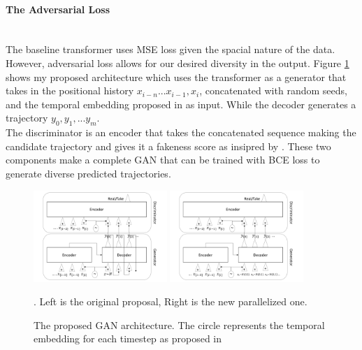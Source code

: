 \documentclass{article}
\begin{document}
\paragraph{The Adversarial Loss}$ $
\\The baseline transformer uses MSE loss given the spacial nature of the data. However, adversarial loss allows for our desired diversity in the output. Figure \ref{gen_disc_figure} shows my proposed architecture which uses the transformer as a generator that takes in the positional history $x_{i-n}...x_{i-1}, x_{i}$, concatenated with random seeds, and the temporal embedding proposed in \cite{giuliari2020transformer} as input. While the decoder generates a trajectory $y_0, y_1, ... y_m$. 
\\ The discriminator is an encoder that takes the concatenated sequence making the candidate trajectory and gives it a fakeness score as insipred by \cite{fakereviewsgan}. These two components make a complete GAN that can be trained with BCE loss to generate diverse predicted trajectories.

\begin{figure}
    \centering
    \includegraphics[width=0.45\textwidth]{gen-disc-figure.pdf}
    \includegraphics[width=0.45\textwidth]{gen-disc-parallel-figure.pdf}\\
    \caption{The proposed GAN architecture.  The circle represents the temporal embedding for each timestep as proposed in \cite{giuliari2020transformer}}. Left is the original proposal, Right is the new parallelized one.
    \label{gen_disc_figure}
\end{figure}
\end{document}
